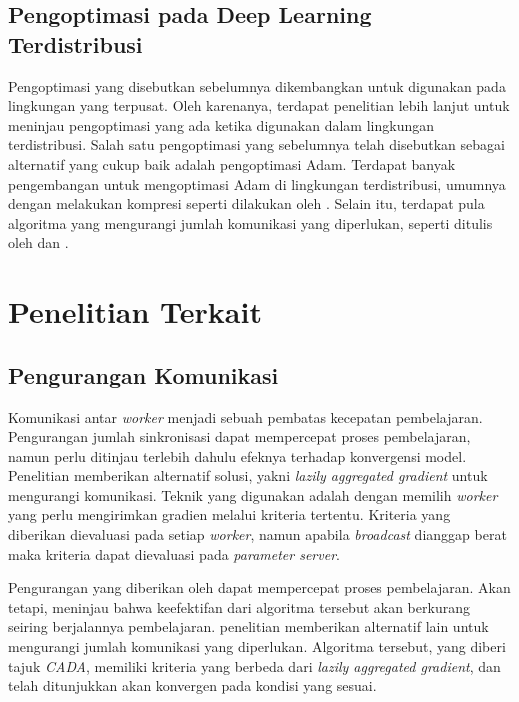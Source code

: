 \subsection{Pengoptimasi pada Deep Learning Terdistribusi}
Pengoptimasi yang disebutkan sebelumnya dikembangkan untuk digunakan pada lingkungan yang terpusat. Oleh karenanya, terdapat penelitian lebih lanjut untuk meninjau pengoptimasi yang ada ketika digunakan dalam lingkungan terdistribusi. Salah satu pengoptimasi yang sebelumnya telah disebutkan sebagai alternatif yang cukup baik adalah pengoptimasi Adam. Terdapat banyak pengembangan untuk mengoptimasi Adam di lingkungan terdistribusi, umumnya dengan melakukan kompresi seperti dilakukan oleh \textcite{Chen2021CADA}. Selain itu, terdapat pula algoritma yang mengurangi jumlah komunikasi yang diperlukan, seperti ditulis oleh \textcite{Li2022Federated} dan \textcite{Chen2021CADA}.

\section{Penelitian Terkait}

\subsection{Pengurangan Komunikasi}
Komunikasi antar \emph{worker} menjadi sebuah pembatas kecepatan pembelajaran. Pengurangan jumlah sinkronisasi dapat mempercepat proses pembelajaran, namun perlu ditinjau terlebih dahulu efeknya terhadap konvergensi model. Penelitian \textcite{Chen2018LAG} memberikan alternatif solusi, yakni \emph{lazily aggregated gradient} untuk mengurangi komunikasi. Teknik yang digunakan adalah dengan memilih \emph{worker} yang perlu mengirimkan gradien melalui kriteria tertentu. Kriteria yang diberikan dievaluasi pada setiap \emph{worker}, namun apabila \emph{broadcast} dianggap berat maka kriteria dapat dievaluasi pada \emph{parameter server}.

Pengurangan yang diberikan oleh \textcite{Chen2018LAG} dapat mempercepat proses pembelajaran. Akan tetapi, \textcite{Chen2021CADA} meninjau bahwa keefektifan dari algoritma tersebut akan berkurang seiring berjalannya pembelajaran. penelitian \textcite{Chen2021CADA} memberikan alternatif lain untuk mengurangi jumlah komunikasi yang diperlukan. Algoritma tersebut, yang diberi tajuk \emph{CADA}, memiliki kriteria yang berbeda dari \emph{lazily aggregated gradient}, dan telah ditunjukkan akan konvergen pada kondisi yang sesuai.

